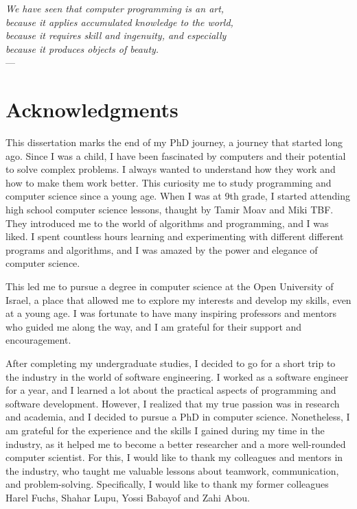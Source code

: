 
\begin{flushright}{\slshape    
    We have seen that computer programming is an art, \\ 
    because it applies accumulated knowledge to the world, \\ 
    because it requires skill and ingenuity, and especially \\
    because it produces objects of beauty.} \\ \medskip
    ---  \citep{Knuth74}
\end{flushright}




\bigskip

\begingroup
\let\clearpage\relax
\let\cleardoublepage\relax
\let\cleardoublepage\relax
\chapter*{Acknowledgments}
This dissertation marks the end of my PhD journey, a journey that started long ago. Since I was a child, I have been fascinated by computers and their potential to solve complex problems. 
I always wanted to understand how they work and how to make them work better. This curiosity me to study programming and computer science since a young age.
When I was at 9th grade, I started attending high school computer science lessons, thaught by Tamir Moav and Miki TBF. They introduced me to the world of algorithms and programming, and I was liked. I spent countless hours learning and experimenting with different different programs and algorithms, and I was amazed by the power and elegance of computer science.

This led me to pursue a degree in computer science at the Open University of Israel, a place that allowed me to explore my interests and develop my skills, even at a young age. I was fortunate to have many inspiring professors and mentors who guided me along the way, and I am grateful for their support and encouragement.

After completing my undergraduate studies, I decided to go for a short trip to the industry in the world of software engineering. I worked as a software engineer for a year, and I learned a lot about the practical aspects of programming and software development. However, I realized that my true passion was in research and academia, and I decided to pursue a PhD in computer science. Nonetheless, I am grateful for the experience and the skills I gained during my time in the industry, as it helped me to become a better researcher and a more well-rounded computer scientist. For this, I would like to thank my colleagues and mentors in the industry, who taught me valuable lessons about teamwork, communication, and problem-solving. Specifically, I would like to thank my former colleagues Harel Fuchs, Shahar Lupu, Yossi Babayof and Zahi Abou.

